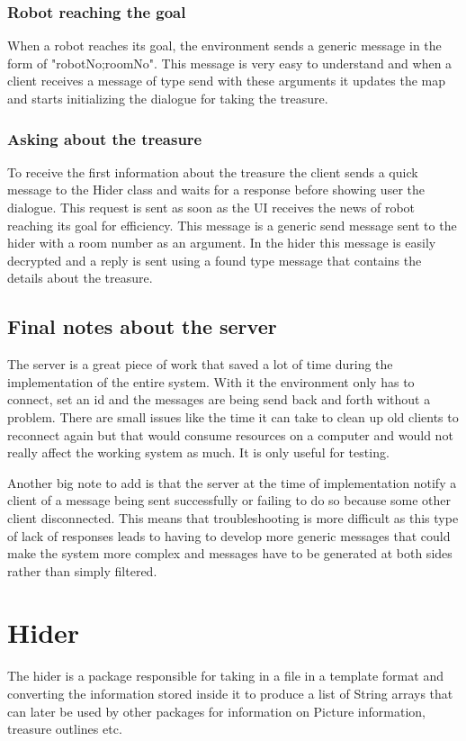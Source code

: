       \subsubsection{Robot reaching the goal}
        When a robot reaches its goal, the environment sends a generic message in the form of "robotNo;roomNo". This message is very easy to understand and when a client receives a message of type send with these arguments it updates the map and starts initializing the dialogue for taking the treasure.

      \subsubsection{Asking about the treasure}
        To receive the first information about the treasure the client sends a quick message to the Hider class and waits for a response before showing user the dialogue. This request is sent as soon as the UI receives the news of robot reaching its goal for efficiency. This message is a generic send message sent to the hider with a room number as an argument. In the hider this message is easily decrypted and a reply is sent using a found type message that contains the details about the treasure.

    \subsection{Final notes about the server}
      The server is a great piece of work that saved a lot of time during the implementation of the entire system. With it the environment only has to connect, set an id and the messages are being send back and forth without a problem. There are small issues like the time it can take to clean up old clients to reconnect again but that would consume resources on a computer and would not really affect the working system as much. It is only useful for testing.

      Another big note to add is that the server at the time of implementation notify a client of a message being sent successfully or failing to do so because some other client disconnected. This means that troubleshooting is more difficult as this type of lack of responses leads to having to develop more generic messages that could make the system more complex and messages have to be generated at both sides rather than simply filtered.

  \section{Hider}
    The hider is a package responsible for taking in a file in a template format and converting the information stored inside it to produce a list of String arrays that can later be used by other packages for information on Picture information, treasure outlines etc.

